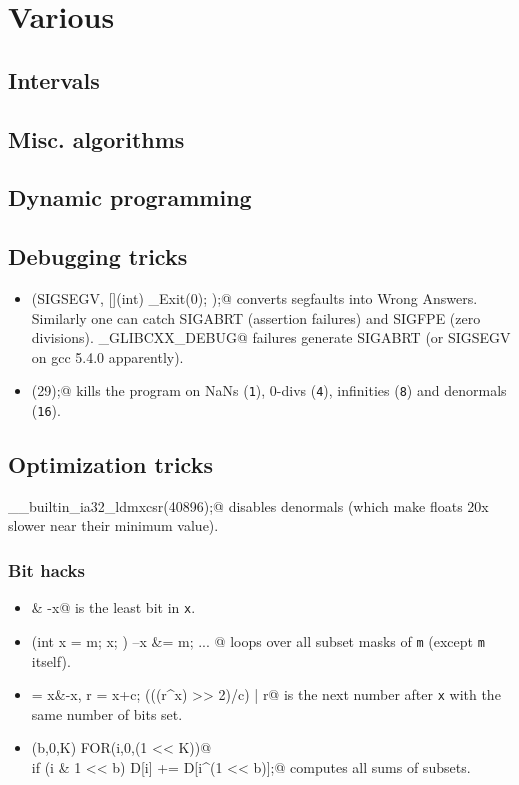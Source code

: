 \chapter{Various}

\section{Intervals}

\section{Misc. algorithms}

\section{Dynamic programming}

\section{Debugging tricks}
	\begin{itemize}
		\item \verb@signal(SIGSEGV, [](int) { _Exit(0); });@ converts segfaults into Wrong Answers.
			Similarly one can catch SIGABRT (assertion failures) and SIGFPE (zero divisions).
			\verb@_GLIBCXX_DEBUG@ failures generate SIGABRT (or SIGSEGV on gcc 5.4.0 apparently).
		\item \verb@feenableexcept(29);@ kills the program on NaNs (\texttt 1), 0-divs (\texttt 4), infinities (\texttt 8) and denormals (\texttt{16}).
	\end{itemize}

\section{Optimization tricks}
	\verb@__builtin_ia32_ldmxcsr(40896);@ disables denormals (which make floats 20x slower near their minimum value).
	\subsection{Bit hacks}
		\begin{itemize}
			\item \verb@x & -x@ is the least bit in \texttt{x}.
			\item \verb@for (int x = m; x; ) { --x &= m; ... }@ loops over all subset masks of \texttt{m} (except \texttt{m} itself).
			\item \verb@c = x&-x, r = x+c; (((r^x) >> 2)/c) | r@ is the next number after \texttt{x} with the same number of bits set.
			\item \verb@FOR(b,0,K) FOR(i,0,(1 << K))@ \\ \verb@  if (i & 1 << b) D[i] += D[i^(1 << b)];@ computes all sums of subsets.
		\end{itemize}
